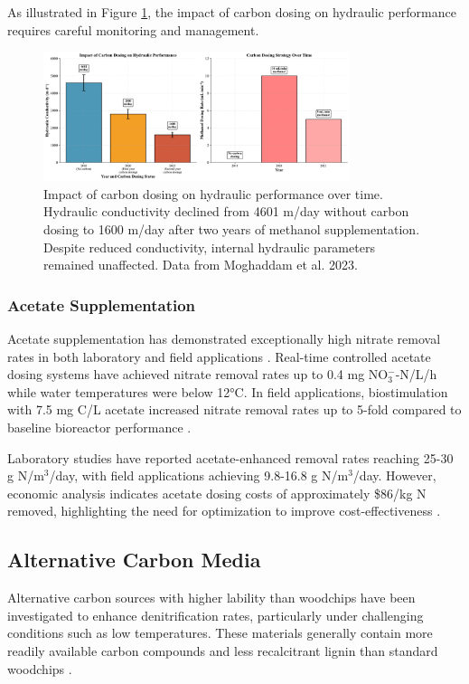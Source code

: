 \documentclass[12pt,a4paper]{article}
\begin{document}
As illustrated in Figure \ref{fig:hydraulic_performance}, the impact of carbon dosing on hydraulic performance requires careful monitoring and management.

\begin{figure}[ht]
\centering
\includegraphics[width=0.8\textwidth]{fig3_hydraulic_performance_scientific}
\caption{Impact of carbon dosing on hydraulic performance over time. Hydraulic conductivity declined from 4601 m/day without carbon dosing to 1600 m/day after two years of methanol supplementation. Despite reduced conductivity, internal hydraulic parameters remained unaffected. Data from Moghaddam et al. 2023.}
\label{fig:hydraulic_performance}
\end{figure}

\subsubsection{Acetate Supplementation}

Acetate supplementation has demonstrated exceptionally high nitrate removal rates in both laboratory and field applications \citep{RN196}. Real-time controlled acetate dosing systems have achieved nitrate removal rates up to 0.4 mg NO$_3^-$-N/L/h while water temperatures were below 12°C. In field applications, biostimulation with 7.5 mg C/L acetate increased nitrate removal rates up to 5-fold compared to baseline bioreactor performance \citep{RN196}.

Laboratory studies have reported acetate-enhanced removal rates reaching 25-30 g N/m$^3$/day, with field applications achieving 9.8-16.8 g N/m$^3$/day. However, economic analysis indicates acetate dosing costs of approximately \$86/kg N removed, highlighting the need for optimization to improve cost-effectiveness \citep{RN196}.

\subsection{Alternative Carbon Media}

Alternative carbon sources with higher lability than woodchips have been investigated to enhance denitrification rates, particularly under challenging conditions such as low temperatures. These materials generally contain more readily available carbon compounds and less recalcitrant lignin than standard woodchips \citep{RN1180}.
\end{document}
